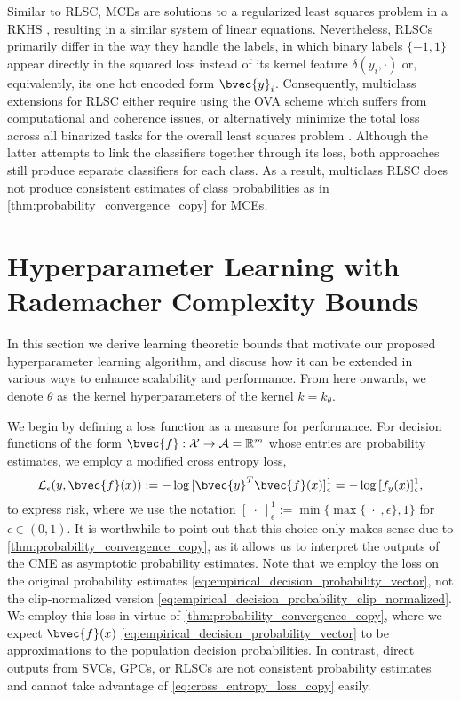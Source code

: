 \documentclass[runningheads, envcountsame, a4paper]{llncs}
\begin{document}
		Similar to \gls{RLSC}, \glspl{MCE} are solutions to a regularized least squares problem in a \gls{RKHS} \citep{grunewalder2012conditional}, resulting in a similar system of linear equations. Nevertheless, \glspl{RLSC} primarily differ in the way they handle the labels, in which binary labels $\{-1, 1\}$ appear directly in the squared loss instead of its kernel feature $\delta(y_{i}, \cdot)$ or, equivalently, its one hot encoded form $\bvec{y}_{i}$. Consequently, multiclass extensions for \gls{RLSC} either require using the \gls{OVA} scheme \citep{rifkin2003regularized} which suffers from computational and coherence issues, or alternatively minimize the total loss across all binarized tasks for the overall least squares problem \citep{pahikkala2012unsupervised}. Although the latter attempts to link the classifiers together through its loss, both approaches still produce separate classifiers for each class. As a result, multiclass \gls{RLSC} does not produce consistent estimates of class probabilities as in \cref{thm:probability_convergence_copy} for \glspl{MCE}.
	
	\section{Hyperparameter Learning with Rademacher Complexity Bounds}
	\label{sec:hyperparameter_learning}
	
		In this section we derive learning theoretic bounds that motivate our proposed hyperparameter learning algorithm, and discuss how it can be extended in various ways to enhance scalability and performance. From here onwards, we denote $\theta$ as the kernel hyperparameters of the kernel $k = k_{\theta}$.
		
		We begin by defining a loss function as a measure for performance. For decision functions of the form $\bvec{f} : \mathcal{X} \to \mathcal{A} = \mathbb{R}^{m}$ whose entries are probability estimates, we employ a modified cross entropy loss,
		\begin{equation}
			\mathcal{L}_{\epsilon}(y, \bvec{f}(x)) := - \log{ [\bvec{y}^{T} \bvec{f}(x)]_{\epsilon}^{1} } = - \log{ [f_{y}(x)]_{\epsilon}^{1} },
		\label{eq:cross_entropy_loss_copy}
		\end{equation}
		to express risk, where we use the notation $[\;\cdot\;]_{\epsilon}^{1} := \min\{\max\{\;\cdot\;, \epsilon\}, 1\}$ for $\epsilon \in (0, 1)$. It is worthwhile to point out that this choice only makes sense due to \cref{thm:probability_convergence_copy}, as it allows us to interpret the outputs of the \gls{CME} as asymptotic probability estimates. Note that we employ the loss on the original probability estimates \eqref{eq:empirical_decision_probability_vector}, not the clip-normalized version \eqref{eq:empirical_decision_probability_clip_normalized}. We employ this loss in virtue of \cref{thm:probability_convergence_copy}, where we expect $\bvec{f}(x)$ \eqref{eq:empirical_decision_probability_vector} to be approximations to the population decision probabilities. In contrast, direct outputs from \glspl{SVC}, \glspl{GPC}, or \glspl{RLSC} are not consistent probability estimates and cannot take advantage of \eqref{eq:cross_entropy_loss_copy} easily.
		
\end{document}
